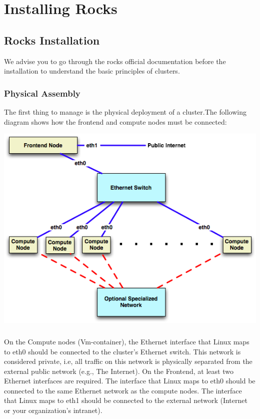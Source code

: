 
\chapter{Installing Rocks}

\section{Rocks Installation}
We advise you to go through the rocks official \cite{rocksinstall} documentation  before the installation to understand the basic principles of clusters.\\
\subsection{Physical Assembly}
The first thing to manage is the physical deployment of a cluster.The following diagram shows how the frontend and compute nodes must be connected:

\includegraphics[scale=.5]{cluster.png} 
\paragraph{}
On the Compute nodes (Vm-container), the Ethernet interface that Linux maps to eth0 should be connected to the cluster's Ethernet switch. This network is considered private, i.e, all traffic on this network is physically separated from the external public network (e.g., The Internet).
On the Frontend, at least two Ethernet interfaces are required. The interface that Linux maps to eth0 should be connected to the same Ethernet network as the compute nodes. The interface that Linux maps to eth1 should be connected to the external network (Internet or your organization's intranet).

